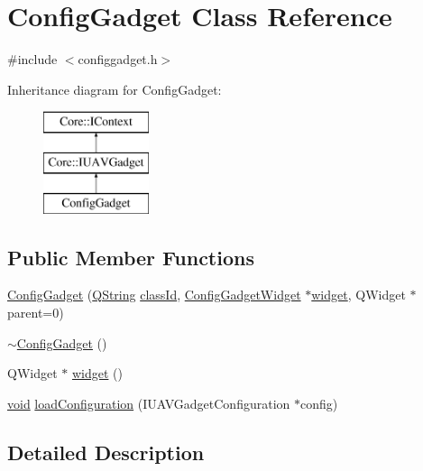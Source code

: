 \hypertarget{class_config_gadget}{\section{\-Config\-Gadget \-Class \-Reference}
\label{class_config_gadget}
}


{\ttfamily \#include $<$configgadget.\-h$>$}

\-Inheritance diagram for \-Config\-Gadget\-:\begin{figure}[H]
\begin{center}
\leavevmode
\includegraphics[height=3.000000cm]{class_config_gadget}
\end{center}
\end{figure}
\subsection*{\-Public \-Member \-Functions}
\begin{DoxyCompactItemize}
\item 
\hyperlink{group___config_plugin_gae5427c3bad5fe19de2f24710fd629d87}{\-Config\-Gadget} (\hyperlink{group___u_a_v_objects_plugin_gab9d252f49c333c94a72f97ce3105a32d}{\-Q\-String} \hyperlink{group___core_plugin_ga3878fde66a57220608960bcc3fbeef2c}{class\-Id}, \hyperlink{class_config_gadget_widget}{\-Config\-Gadget\-Widget} $\ast$\hyperlink{group___config_plugin_ga678f4bf881dd4095ab62f66d69c32546}{widget}, \-Q\-Widget $\ast$parent=0)
\item 
\hyperlink{group___config_plugin_ga6fbabaaacad7e51739c18053d5aa83fd}{$\sim$\-Config\-Gadget} ()
\item 
\-Q\-Widget $\ast$ \hyperlink{group___config_plugin_ga678f4bf881dd4095ab62f66d69c32546}{widget} ()
\item 
\hyperlink{group___u_a_v_objects_plugin_ga444cf2ff3f0ecbe028adce838d373f5c}{void} \hyperlink{group___config_plugin_ga43acf4e389daaf28085a3773b4abc903}{load\-Configuration} (\-I\-U\-A\-V\-Gadget\-Configuration $\ast$config)
\end{DoxyCompactItemize}


\subsection{\-Detailed \-Description}


